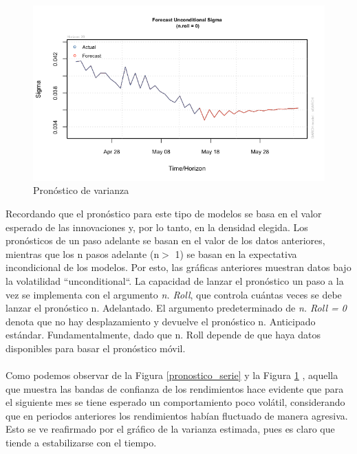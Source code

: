 \begin{figure}[!ht]
    \centering
    \includegraphics[scale=.5]{Graficos/Pronostico de Varianza.png}
    \caption{Pronóstico de varianza}
    \label{pronostico_varianza}
\end{figure}

\newpage
Recordando que el pronóstico para este tipo de modelos se basa en el valor esperado de las innovaciones y, por lo tanto, en la densidad elegida. Los pronósticos de un paso adelante se basan en el valor de los datos anteriores, mientras que los n pasos adelante (n$>$ 1) se basan en la expectativa incondicional de los modelos. Por esto, las gráficas anteriores muestran datos bajo la volatilidad ``unconditional``. La capacidad de lanzar el pronóstico un paso a la vez se implementa con el argumento \textit{n. Roll}, que controla cuántas veces se debe lanzar el pronóstico n. Adelantado. El argumento predeterminado de \textit{n. Roll = 0} denota que no hay desplazamiento y devuelve el pronóstico n. Anticipado estándar. Fundamentalmente, dado que n. Roll depende de que haya datos disponibles para basar el pronóstico móvil.
\\\\
Como podemos observar de la Figura \ref{pronostico_serie} y la Figura \ref{pronostico_varianza} , aquella que muestra las bandas de confianza de los rendimientos hace evidente que para el siguiente mes se tiene esperado un comportamiento poco volátil, considerando que en periodos anteriores los rendimientos habían fluctuado de manera agresiva. Esto se ve reafirmado por el gráfico de la varianza estimada, pues es claro que tiende a estabilizarse con el tiempo. 

